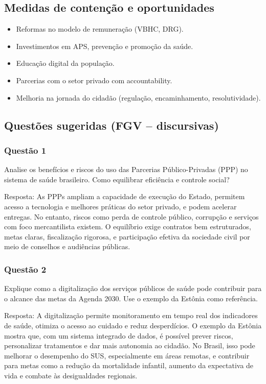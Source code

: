 \documentclass[a4paper,12pt]{article}
\begin{document}
\subsection{Medidas de contenção e oportunidades}
\label{sec:orgf6d1414}
\begin{itemize}
\item Reformas no modelo de remuneração (VBHC, DRG).
\item Investimentos em APS, prevenção e promoção da saúde.
\item Educação digital da população.
\item Parcerias com o setor privado com accountability.
\item Melhoria na jornada do cidadão (regulação, encaminhamento, resolutividade).
\end{itemize}
\subsection{Questões sugeridas (FGV – discursivas)}
\label{sec:orgfa18a20}

\subsubsection{Questão 1}
\label{sec:org2264fc9}
Analise os benefícios e riscos do uso das Parcerias Público-Privadas (PPP) no sistema de saúde brasileiro. Como equilibrar eficiência e controle social?

Resposta:
As PPPs ampliam a capacidade de execução do Estado, permitem acesso a tecnologia e melhores práticas do setor privado, e podem acelerar entregas. No entanto, riscos como perda de controle público, corrupção e serviços com foco mercantilista existem. O equilíbrio exige contratos bem estruturados, metas claras, fiscalização rigorosa, e participação efetiva da sociedade civil por meio de conselhos e audiências públicas.
\subsubsection{Questão 2}
\label{sec:org6d6b71a}
Explique como a digitalização dos serviços públicos de saúde pode contribuir para o alcance das metas da Agenda 2030. Use o exemplo da Estônia como referência.

Resposta:
A digitalização permite monitoramento em tempo real dos indicadores de saúde, otimiza o acesso ao cuidado e reduz desperdícios. O exemplo da Estônia mostra que, com um sistema integrado de dados, é possível prever riscos, personalizar tratamentos e dar mais autonomia ao cidadão. No Brasil, isso pode melhorar o desempenho do SUS, especialmente em áreas remotas, e contribuir para metas como a redução da mortalidade infantil, aumento da expectativa de vida e combate às desigualdades regionais.
\end{document}
